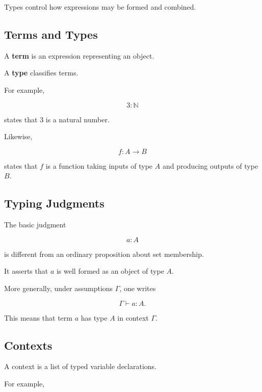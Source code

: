 Types control how expressions may be formed and combined.

\subsection{Terms and Types}
\label{subsec:terms-and-types}

A \textbf{term} is an expression representing an object.

A \textbf{type} classifies terms.

For example,

\[
\boxed{
3:\mathbb{N}
}
\]

states that \(3\) is a natural number.

Likewise,

\[
\boxed{
f:A\to B
}
\]

states that \(f\) is a function taking inputs of type \(A\) and producing
outputs of type \(B\).

\subsection{Typing Judgments}
\label{subsec:typing-judgments}

The basic judgment

\[
\boxed{
a:A
}
\]

is different from an ordinary proposition about set membership.

It asserts that \(a\) is well formed as an object of type \(A\).

More generally, under assumptions \(\Gamma\), one writes

\[
\boxed{
\Gamma\vdash a:A.
}
\]

This means that term \(a\) has type \(A\) in context \(\Gamma\).

\subsection{Contexts}
\label{subsec:type-theoretic-contexts}

A context is a list of typed variable declarations.

For example,

